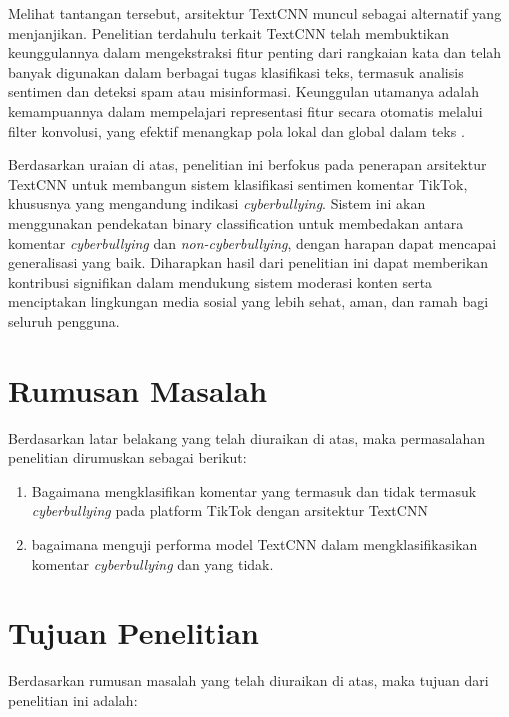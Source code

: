Melihat tantangan tersebut, arsitektur TextCNN muncul sebagai alternatif yang menjanjikan. Penelitian terdahulu terkait TextCNN telah membuktikan keunggulannya dalam mengekstraksi fitur penting dari rangkaian kata dan telah banyak digunakan dalam berbagai tugas klasifikasi teks, termasuk analisis sentimen dan deteksi spam atau misinformasi. Keunggulan utamanya adalah kemampuannya dalam mempelajari representasi fitur secara otomatis melalui filter konvolusi, yang efektif menangkap pola lokal dan global dalam teks \cite{kim2014convolutional}.

Berdasarkan uraian di atas, penelitian ini berfokus pada penerapan arsitektur TextCNN untuk membangun sistem klasifikasi sentimen komentar TikTok, khususnya yang mengandung indikasi \textit{cyberbullying}. Sistem ini akan menggunakan pendekatan binary classification untuk membedakan antara komentar \textit{cyberbullying} dan \textit{non-cyberbullying}, dengan harapan dapat mencapai generalisasi yang baik. Diharapkan hasil dari penelitian ini dapat memberikan kontribusi signifikan dalam mendukung sistem moderasi konten serta menciptakan lingkungan media sosial yang lebih sehat, aman, dan ramah bagi seluruh pengguna.

\section{Rumusan Masalah} \label{I.Rumusan Masalah}

Berdasarkan latar belakang yang telah diuraikan di atas, maka permasalahan penelitian dirumuskan sebagai berikut: \par

\begin{enumerate}[noitemsep]
    \item Bagaimana mengklasifikan komentar yang termasuk dan tidak termasuk \textit{cyberbullying} pada platform TikTok dengan arsitektur TextCNN
    \item bagaimana menguji performa model TextCNN dalam mengklasifikasikan komentar \textit{cyberbullying} dan yang tidak.
\end{enumerate}

\section{Tujuan Penelitian} \label{I.Tujuan}
Berdasarkan rumusan masalah yang telah diuraikan di atas, maka tujuan dari penelitian ini adalah: \par

